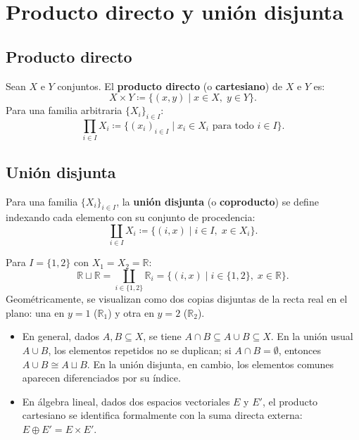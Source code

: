 \section{Producto directo y unión disjunta}

\subsection*{Producto directo}
Sean $X$ e $Y$ conjuntos. El \textbf{producto directo} (o \textbf{cartesiano}) de $X$ e $Y$ es:
$$
    X \times Y \coloneqq \{(x, y) \mid x \in X, \; y \in Y\} \text{}.
$$
Para una familia arbitraria $\{X_i\}_{i \in I}$:
$$
    \prod_{i \in I} X_i \coloneqq \{(x_i)_{i \in I} \mid x_i \in X_i \text{ para todo } i \in I\} \text{}.
$$

\subsection*{Unión disjunta}
Para una familia $\{X_i\}_{i \in I}$, la \textbf{unión disjunta} (o \textbf{coproducto}) se define indexando cada elemento con su conjunto de procedencia:
$$
    \coprod_{i \in I} X_i \coloneqq \{(i, x) \mid i \in I, \; x \in X_i\} \text{}.
$$

\begin{ejem}
Para $I = \{1, 2\}$ con $X_1 = X_2 = \mathbb{R}$:
$$
    \mathbb{R} \sqcup \mathbb{R} = \coprod_{i \in \{1, 2\}} \mathbb{R}_i = \{(i, x) \mid i \in \{1, 2\}, \; x \in \mathbb{R}\} \text{}.
$$
Geométricamente, se visualizan como dos copias disjuntas de la recta real en el plano: una en $y = 1$ ($\mathbb{R}_1$) y otra en $y = 2$ ($\mathbb{R}_2$).
\end{ejem}

\begin{obs}
\begin{itemize}
    \item En general, dados $A, B \subseteq X$, se tiene $A \cap B \subseteq A \cup B \subseteq X$. En la unión usual $A \cup B$, los elementos repetidos no se duplican; si $A \cap B = \emptyset$, entonces $A \cup B \cong A \sqcup B$. En la unión disjunta, en cambio, los elementos comunes aparecen diferenciados por su índice.
    \item En álgebra lineal, dados dos espacios vectoriales $E$ y $E'$, el producto cartesiano se identifica formalmente con la suma directa externa: $E \oplus E' = E \times E'$.
\end{itemize}
\end{obs}

